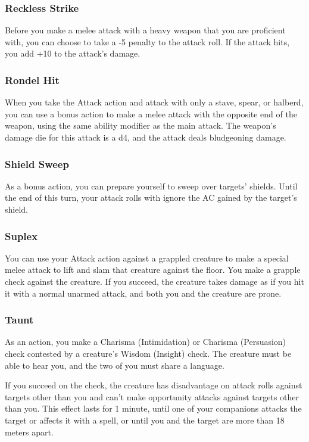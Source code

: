 \subsubsection{Reckless Strike} \label{tec::recklessstrike}
Before you make a melee attack with a heavy weapon that you are proficient with, you can choose to take a -5 penalty to the attack roll.
If the attack hits, you add +10 to the attack's damage.

\subsubsection{Rondel Hit} \label{tec::rondelhit}
When you take the Attack action and attack with only a stave, spear, or halberd, you can use a bonus action to make a melee attack with the opposite end of the weapon, using the same ability modifier as the main attack.
The weapon's damage die for this attack is a d4, and the attack deals bludgeoning damage.

\subsubsection{Shield Sweep} \label{tec::shieldsweep}
As a bonus action, you can prepare yourself to sweep over targets' shields.
Until the end of this turn, your attack rolls with ignore the AC gained by the target's shield.

\subsubsection{Suplex} \label{tec::suplex}
You can use your Attack action against a grappled creature to make a special melee attack to lift and slam that creature against the floor.
You make a grapple check against the creature.
If you succeed, the creature takes damage as if you hit it with a normal unarmed attack, and both you and the creature are prone.

\subsubsection{Taunt} \label{tec::taunt}
As an action, you make a Charisma (Intimidation) or Charisma (Persuasion) check contested by a creature's Wisdom (Insight) check.
The creature must be able to hear you, and the two of you must share a language.

If you succeed on the check, the creature has disadvantage on attack rolls against targets other than you and can't make opportunity attacks against targets other than you.
This effect lasts for 1 minute, until one of your companions attacks the target or affects it with a spell, or until you and the target are more than 18 meters apart.

